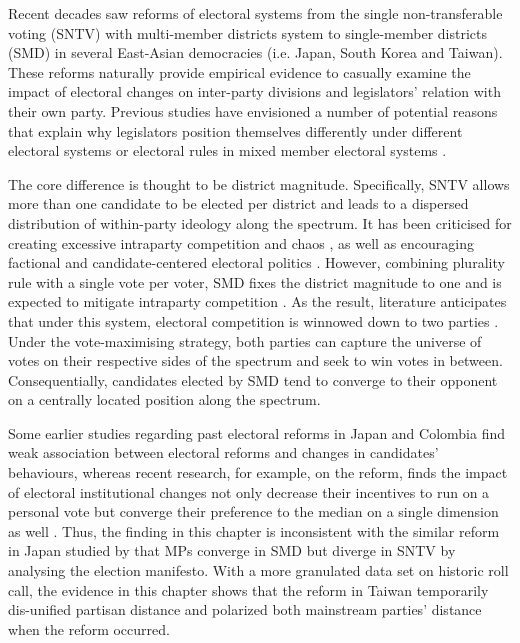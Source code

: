 Recent decades saw reforms of electoral systems from the single non-transferable voting (SNTV) with multi-member districts system to single-member districts (SMD) in several East-Asian democracies (i.e. Japan, South Korea and Taiwan). These reforms naturally provide empirical evidence to casually examine the impact of electoral changes on inter-party divisions and legislators' relation with their own party. Previous studies have envisioned a number of potential reasons that explain why legislators position themselves differently under different electoral systems \citep{Catalinac2016} or electoral rules in mixed member electoral systems \citep[e.g. ][]{Batto2012, Hirano2011, Jun2010, Rich2014}. 

The core difference is thought to be district magnitude. Specifically, SNTV allows more than one candidate to be elected per district and leads to a dispersed distribution of within-party ideology along the spectrum. It has been criticised for creating excessive intraparty competition and chaos \citep[][]{Cox1990, Hirano2006, Ames1995}, as well as encouraging factional and candidate-centered electoral politics \citep[e.g.][]{Batto2016, Wu2003}. However, combining plurality rule with a single vote per voter, SMD fixes the district magnitude to one and is expected to mitigate intraparty competition \citep[][]{Carey1995, Shugart2003, Andre2014}. As the result, literature anticipates that under this system, electoral competition is winnowed down to two parties \citep[][]{Catalinac2016}. Under the vote-maximising strategy, both parties can capture the universe of votes on their respective sides of the spectrum and seek to win votes in between. Consequentially, candidates elected by SMD tend to converge to their opponent on a centrally located position along the spectrum.

Some earlier studies regarding past electoral reforms in Japan and Colombia \citep[e.g.,][]{Hideo1998, Crisp2002, Christensen1994} find weak association between electoral reforms and changes in candidates' behaviours, whereas recent research, for example, on the reform, finds the impact of electoral institutional changes not only decrease their incentives to run on a personal vote \citep[e.g.,][]{Catalinac2017, Sheng2014a} but converge their preference to the median on a single dimension as well \citep[e.g.,][]{Catalinac2017, Catalinac2016, Sheng2014a}. Thus, the finding in this chapter is inconsistent with the similar reform in Japan studied by \citet{Catalinac2016} that MPs converge in SMD but diverge in SNTV by analysing the election manifesto. With a more granulated data set on historic roll call, the evidence in this chapter shows that the reform in Taiwan temporarily dis-unified partisan distance and polarized both mainstream parties' distance when the reform occurred. 

